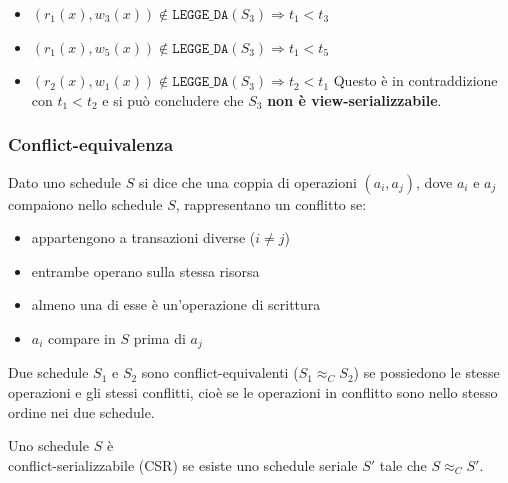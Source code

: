 \documentclass[a4paper,twoside]{article}
\begin{document}
\begin{exercise}
\begin{itemize}
\begin{itemize}
         \item \( (r_1(x), w_3(x)) \notin \texttt{LEGGE\_DA}(S_3) \Rightarrow
           t_1 < t_3 \)

         \item \( (r_1(x), w_5(x)) \notin \texttt{LEGGE\_DA}(S_3) \Rightarrow
           t_1 < t_5 \)

         \item \( (r_2(x), w_1(x)) \notin \texttt{LEGGE\_DA}(S_3) \Rightarrow
           t_2 < t_1 \) Questo è in contraddizione con \( t_1 < t_2 \)
           e si può concludere che \( S_3 \) \textbf{non è view-serializzabile}.
       \end{itemize}
  \end{itemize}
\end{exercise}

\subsubsection{Conflict-equivalenza}

\begin{definition}[Conflitto]
  Dato uno schedule \( S \) si dice che una coppia di operazioni \( (a_i, a_j) \),
  dove \( a_i \) e \( a_j \) compaiono nello schedule \( S \), rappresentano un
  conflitto se:
  \begin{itemize}
    \item appartengono a transazioni diverse (\( i \neq j \))

    \item entrambe operano sulla stessa risorsa

    \item almeno una di esse è un'operazione di scrittura

    \item \( a_i \) compare in \( S \) prima di \( a_j \)
  \end{itemize}
\end{definition}

\begin{definition}
  Due schedule \( S_1 \) e \( S_2 \) sono conflict-equivalenti (\( S_1 \approx_C S_2 \))
  se possiedono le stesse operazioni e gli stessi conflitti, cioè se le operazioni 
  in conflitto sono nello stesso ordine nei due schedule.
\end{definition}

\begin{definition}
  Uno schedule \( S \) è \\ conflict-serializzabile (CSR) se esiste uno schedule seriale
  \( S' \) tale che \( S \approx_C S' \).
\end{definition}
\end{document}
